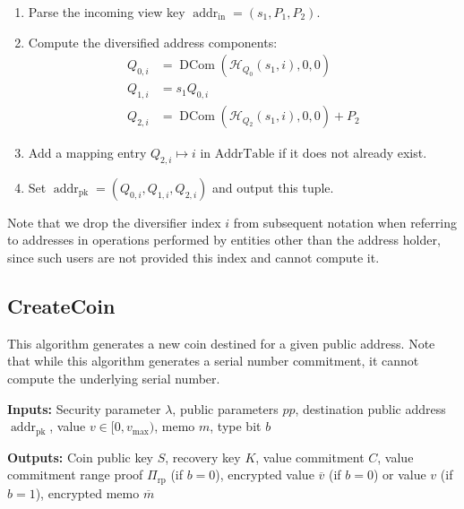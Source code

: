 \documentclass{llncs}
\newcommand{\hash}{\mathcal{H}}
\newcommand{\addr}{\operatorname{addr}}
\newcommand{\dcom}{\operatorname{DCom}}
\begin{document}
\begin{enumerate}
\item Parse the incoming view key $\addr_{\text{in}} = (s_1, P_1, P_2)$.
\item Compute the diversified address components:
\begin{align*}
Q_{0,i} &= \dcom(\hash_{Q_0}(s_1,i),0,0) \\
Q_{1,i} &= s_1 Q_{0,i} \\
Q_{2,i} &= \dcom(\hash_{Q_2}(s_1,i),0,0) + P_2
\end{align*}
\item Add a mapping entry $Q_{2,i} \mapsto i$ in $\text{AddrTable}$ if it does not already exist.
\item Set $\addr_{\text{pk}} = (Q_{0,i},Q_{1,i},Q_{2,i})$ and output this tuple.
\end{enumerate}
Note that we drop the diversifier index $i$ from subsequent notation when referring to addresses in operations performed by entities other than the address holder, since such users are not provided this index and cannot compute it.


\subsection{CreateCoin}

This algorithm generates a new coin destined for a given public address.
Note that while this algorithm generates a serial number commitment, it cannot compute the underlying serial number.

\textbf{Inputs:} Security parameter $\lambda$, public parameters $pp$, destination public address $\addr_{\text{pk}}$, value $v \in [0, v_{\text{max}})$, memo $m$, type bit $b$

\textbf{Outputs:} Coin public key $S$, recovery key $K$, value commitment $C$, value commitment range proof $\Pi_{\text{rp}}$ (if $b=0$), encrypted value $\overline{v}$ (if $b=0$) or value $v$ (if $b=1$), encrypted memo $\overline{m}$
\end{document}
